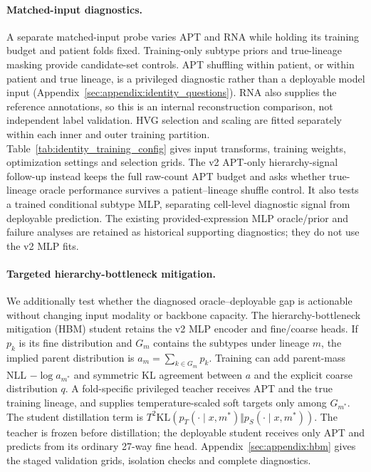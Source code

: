 \paragraph{Matched-input diagnostics.}
A separate matched-input probe varies APT and RNA while holding its training
budget and patient folds fixed. Training-only subtype priors and true-lineage
masking provide candidate-set controls. APT shuffling within patient, or within
patient and true lineage, is a privileged diagnostic rather than a deployable
model input (Appendix~\ref{sec:appendix:identity_questions}).
RNA also supplies the reference annotations, so this is an internal
reconstruction comparison, not independent label validation. HVG selection
and scaling are fitted separately within each inner and outer training
partition. Table~\ref{tab:identity_training_config} gives input transforms,
training weights, optimization settings and selection grids.
The v2 APT-only hierarchy-signal follow-up instead keeps the full raw-count
APT budget and asks whether true-lineage oracle performance survives a
patient--lineage shuffle control. It also tests a trained conditional subtype
MLP, separating cell-level diagnostic signal from deployable prediction.
The existing provided-expression MLP oracle/prior and failure analyses are
retained as historical supporting diagnostics; they do not use the v2 MLP fits.

\paragraph{Targeted hierarchy-bottleneck mitigation.}
We additionally test whether the diagnosed oracle--deployable gap is actionable
without changing input modality or backbone capacity. The hierarchy-bottleneck
mitigation (HBM) student retains
the v2 MLP encoder and fine/coarse heads. If $p_k$ is its fine distribution and
$G_m$ contains the subtypes under lineage $m$, the implied parent distribution
is $a_m=\sum_{k\in G_m}p_k$. Training can add parent-mass NLL
$-\log a_{m^*}$ and symmetric KL agreement between $a$ and the explicit coarse
distribution $q$. A fold-specific privileged teacher receives APT and the true
training lineage, and supplies temperature-scaled soft targets only among
$G_{m^*}$. The student distillation term is
$T^2\mathrm{KL}(p_T(\cdot\mid x,m^*)\Vert
p_S(\cdot\mid x,m^*))$. The teacher is frozen before distillation; the
deployable student receives only APT and predicts from its ordinary 27-way fine
head. Appendix~\ref{sec:appendix:hbm} gives the staged validation grids,
isolation checks and complete diagnostics.
